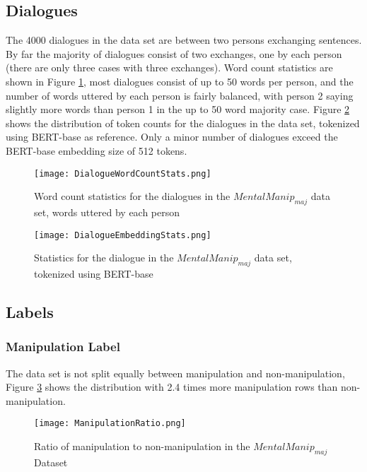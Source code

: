 \documentclass[
	letterpaper, %
	12pt, %
	unnumberedsections, %
	twoside, %
]{LTJournalArticle}
\begin{document}
\subsection{Dialogues}
The 4000 dialogues in the data set are between two persons exchanging sentences. By far the majority of dialogues consist of two exchanges, one by each person (there are only three cases with three exchanges). Word count statistics are shown in Figure \ref{fig:DialogueWordCount}, most dialogues consist of up to 50 words per person, and the number of words uttered by each person is fairly balanced, with person 2 saying slightly more words than person 1 in the up to 50 word majority case. Figure \ref{fig:DialogueEmbedding} shows the distribution of token counts for the dialogues in the data set, tokenized using BERT-base as reference. Only a minor number of dialogues exceed the BERT-base embedding size of 512 tokens.


\begin{figure}[!htp] %
	\centering
	\texttt{[image: DialogueWordCountStats.png]}
	\caption{Word count statistics for the dialogues in the $MentalManip_{maj}$ data set, words uttered by each person}
	\label{fig:DialogueWordCount}
\end{figure}

\begin{figure}[!htp] %
	\centering
	\texttt{[image: DialogueEmbeddingStats.png]}
	\caption{Statistics for the dialogue in the $MentalManip_{maj}$ data set, tokenized using BERT-base}
	\label{fig:DialogueEmbedding}
\end{figure}


\subsection{Labels}

\subsubsection{Manipulation Label}
The data set is not split equally between manipulation and non-manipulation, Figure \ref{fig:ManipulationRatio} shows the distribution with 2.4 times more manipulation rows than non-manipulation.

\begin{figure}[!htp] %
	\centering
	\texttt{[image: ManipulationRatio.png]}
	\caption{Ratio of manipulation to non-manipulation in the $MentalManip_{maj}$ Dataset}
	\label{fig:ManipulationRatio}
\end{figure}
\end{document}
